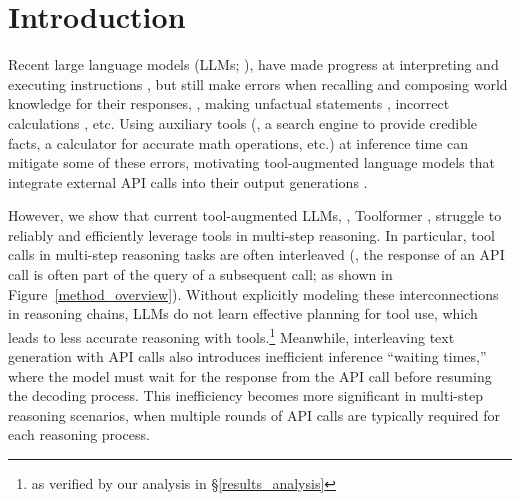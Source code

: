 \section{Introduction}
Recent large language models (LLMs; \citealp{touvron2023llama2,anil2023palm2,openai2023gpt4}), have made progress at interpreting and executing instructions \citep{wei2021finetuned,chung2022scaling}, but still make errors when recalling and composing world knowledge for their responses, \eg{}, making unfactual statements \citep{maynez2020faithfulness,ji2023survey}, incorrect calculations \citep{patel2021nlp}, etc. %
Using auxiliary tools (\eg{}, a search engine to provide credible facts, a calculator for accurate math operations, etc.) at inference time can mitigate some of these errors, motivating tool-augmented language models that integrate external API calls into their output generations \citep{parisi2022talm,schick2023toolformer,hao2023toolkengpt}.

However, we show that current tool-augmented LLMs, \eg{}, Toolformer \citep{schick2023toolformer}, struggle to reliably and efficiently leverage tools in multi-step reasoning.
In particular, tool calls in multi-step reasoning tasks are often interleaved (\ie{}, the response of an API call is often part of the query of a subsequent call; as shown in Figure~\ref{method_overview}).
Without explicitly modeling these interconnections in reasoning chains, LLMs do not learn effective planning for tool use, which leads to less accurate reasoning with tools.\footnote{as verified by our analysis in \S\ref{results_analysis}}
Meanwhile, interleaving text generation with API calls also introduces inefficient inference ``waiting times,'' where the model must wait for the response from the API call before resuming the decoding process. This inefficiency becomes more significant in multi-step reasoning scenarios, when multiple rounds of API calls are typically required for each reasoning process.

